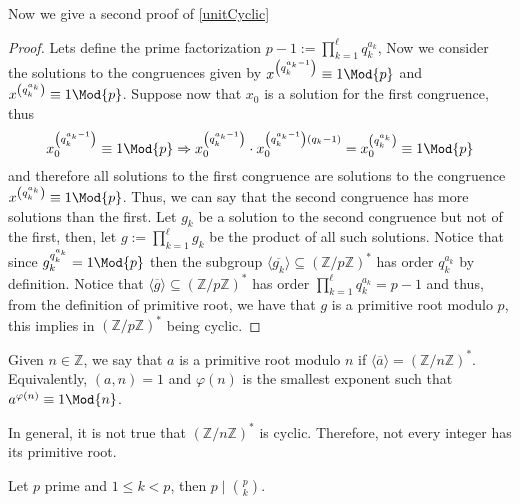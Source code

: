 Now we give a second proof of \ref{unitCyclic}
\begin{proof}
    Lets define the prime factorization \(p-1 := \prod_{k=1}^{\ell} q_k^{a_k}\),
    Now we consider the solutions to the congruences given by  \(x^{\left(
            q_k^{a_k-1} \right)} \equiv 1 \Mod{p}\) and \(x^{\left( q_k^{a_k} \right) }
    \equiv 1 \Mod{p}\). Suppose now that \(x_0\) is a solution for the first
    congruence, thus
    \[
        x_0^{\left( q_k^{a_k-1} \right) } \equiv 1 \Mod{p}
        \Rightarrow
        x_0^{\left( q_k^{a_k-1} \right) } \cdot x_0^{\left( q_k^{a_k-1}
        \right)(q_k-1) }
        = x_0^{\left( q_k^{a_k} \right) } \equiv 1 \Mod{p}
    \]
    and therefore all solutions to the first congruence are solutions to the
    congruence \(x^{\left( q_k^{a_k} \right) } \equiv 1 \Mod{p}\). Thus, we can
    say that the second congruence has more solutions than the first. Let \(g_k\)
    be a solution to the second congruence but not of the first, then, let \(g :=
    \prod_{k=1}^\ell g_k\) be the product of all such solutions. Notice that
    since \(g_k^{q_k^{a_k}} = 1 \Mod{p}\) then the subgroup \(\langle
    \overline{g_k} \rangle \subseteq (\mathbb{Z}/p\mathbb{Z})^\ast\) has order
    \(q_k^{a_k}\) by definition. Notice that \(\langle \overline{g} \rangle
    \subseteq (\mathbb{Z}/p\mathbb{Z})^\ast\) has order \(\prod_{k=1}^\ell
    q_k^{a_k} = p-1\) and thus, from the definition of primitive root, we have
    that \(g\) is a primitive root modulo \(p\), this implies in
    \((\mathbb{Z}/p\mathbb{Z})^\ast\) being cyclic.
\end{proof}

\begin{definition}
    Given \(n \in \mathbb{Z}\), we say that \(a\) is a primitive root modulo
    \(n\) if  \(\langle \overline{a} \rangle = (\mathbb{Z}/n\mathbb{Z})^\ast\).
    Equivalently, \((a, n) = 1\) and \(\varphi(n)\) is the smallest exponent such
    that \(a^{\varphi(n)} \equiv 1 \Mod{n}\).
\end{definition}

\begin{remark}
    In general, it is not true that \((\mathbb{Z}/n\mathbb{Z})^\ast\) is cyclic.
    Therefore, not every integer has its primitive root.
\end{remark}

\begin{lemma}
    Let \(p\) prime and  \(1 \leqslant k < p\), then \(p \mid \binom{p}{k}\).
\end{lemma}

